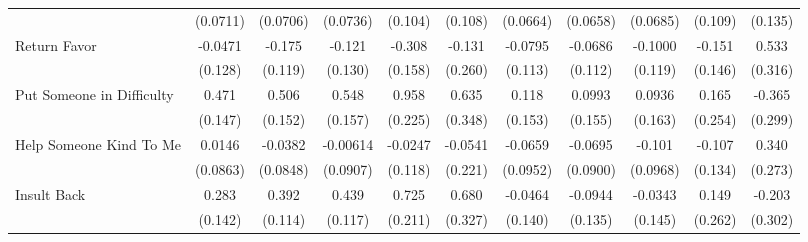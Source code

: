 {\begin{tabular}{l*{10}{c}}
            &    (0.0711)         &    (0.0706)         &    (0.0736)         &     (0.104)         &     (0.108)         &    (0.0664)         &    (0.0658)         &    (0.0685)         &     (0.109)         &     (0.135)         \\
\addlinespace
Return Favor&     -0.0471         &      -0.175         &      -0.121         &      -0.308         &      -0.131         &     -0.0795         &     -0.0686         &     -0.1000         &      -0.151         &       0.533         \\
            &     (0.128)         &     (0.119)         &     (0.130)         &     (0.158)         &     (0.260)         &     (0.113)         &     (0.112)         &     (0.119)         &     (0.146)         &     (0.316)         \\
\addlinespace
Put Someone in Difficulty&       0.471\sym{**} &       0.506\sym{***}&       0.548\sym{***}&       0.958\sym{***}&       0.635         &       0.118         &      0.0993         &      0.0936         &       0.165         &      -0.365         \\
            &     (0.147)         &     (0.152)         &     (0.157)         &     (0.225)         &     (0.348)         &     (0.153)         &     (0.155)         &     (0.163)         &     (0.254)         &     (0.299)         \\
\addlinespace
Help Someone Kind To Me&      0.0146         &     -0.0382         &    -0.00614         &     -0.0247         &     -0.0541         &     -0.0659         &     -0.0695         &      -0.101         &      -0.107         &       0.340         \\
            &    (0.0863)         &    (0.0848)         &    (0.0907)         &     (0.118)         &     (0.221)         &    (0.0952)         &    (0.0900)         &    (0.0968)         &     (0.134)         &     (0.273)         \\
\addlinespace
Insult Back &       0.283\sym{*}  &       0.392\sym{***}&       0.439\sym{***}&       0.725\sym{***}&       0.680\sym{*}  &     -0.0464         &     -0.0944         &     -0.0343         &       0.149         &      -0.203         \\
            &     (0.142)         &     (0.114)         &     (0.117)         &     (0.211)         &     (0.327)         &     (0.140)         &     (0.135)         &     (0.145)         &     (0.262)         &     (0.302)         \\
\bottomrule
\end{tabular}
}
